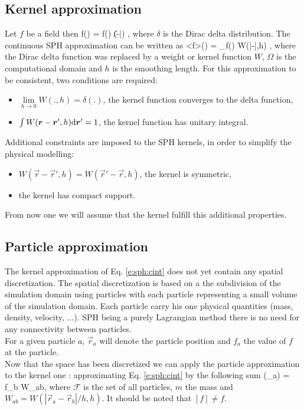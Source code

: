 \documentclass{../GPUSPHtemplate}
\begin{document}
\subsection{Kernel approximation}
Let $f$ be a field then
\be
f() = \int f() \delta(\|-|) \td {},
\label{e:sph:delta}
\en
where $\delta$ is the Dirac delta distribution. The continuous SPH
approximation can be written as
\be
<f>() = \int_\Omega f() W(|-|,h) \td {},
\label{e:sph:cint}
\en
where the Dirac delta function was replaced by a weight or kernel
function $W$, $\Omega$ is the computational domain and $h$ is the
smoothing length. 
For this approximation to be consistent, two conditions are required:
\begin{itemize}
\item $\underset{h\rightarrow 0}{\lim} W(.,h) = \delta(.)$, \ie the
kernel function converges to the delta function,
\item $\int W(\bm{r}-\bm{r}',h) \text{d} \bm{r}' = 1$, \ie the kernel function has unitary
integral.
\end{itemize}
Additional constraints are imposed to the SPH kernels, in order to simplify the
physical modelling:
\begin{itemize}
\item $W(\vec{r}-\vec{r}',h) = W(\vec{r}'-\vec{r},h)$, \ie the kernel is symmetric,
\item the kernel has compact support.
\end{itemize}
From now one we will assume that the kernel fulfill this additional properties.

\subsection{Particle approximation}
The kernel approximation of Eq. \eqref{e:sph:cint} does not yet
contain any spatial discretization. The spatial discretization is based on a
the subdivision of the simulation domain using particles with each particle 
representing  a small volume of the simulation domain. Each particle carry his 
one physical quantities (mass, density, velocity, ...). SPH being a purely Lagrangian
method there is no need for any connectivity between particles.\\
For a given particle $a$, $\vec{r}_a$ will denote the particle position and $f_a$ the 
value of $f$ at the particle.\\
Now that the space has been discretized we can apply the particle approximation to the
kernel one : approximating Eq. \eqref{e:sph:cint} by the following sum
\be
[f](_a) =   f_b W_{ab},
\label{e:sph:int}
\en
where $\mathcal{F}$ is the set of all particles, $m$ the mass and
$W_{ab} = W(|\vec{r}_a - \vec{r}_b|/h, h)$. It should be noted that
$[f] \neq f$.
\end{document}
